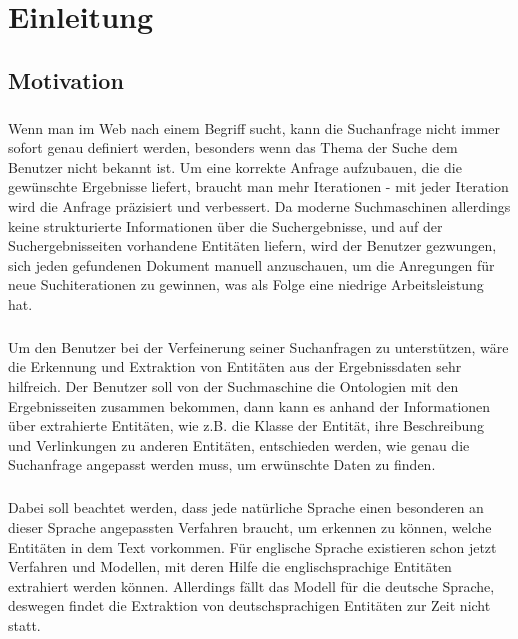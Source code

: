 \chapter{Einleitung}

\section{Motivation}
\label{sec:Motivation}
\paragraph{}
Wenn man im Web nach einem Begriff sucht, kann die Suchanfrage nicht immer sofort genau definiert werden, besonders wenn das Thema der Suche dem Benutzer nicht bekannt ist. Um eine korrekte Anfrage aufzubauen, die die gewünschte Ergebnisse liefert, braucht man mehr Iterationen - mit jeder Iteration wird die Anfrage präzisiert und verbessert. Da moderne Suchmaschinen allerdings keine strukturierte Informationen über die Suchergebnisse, und auf der Suchergebnisseiten vorhandene Entitäten liefern, wird der Benutzer gezwungen, sich jeden gefundenen Dokument manuell anzuschauen, um die Anregungen für neue Suchiterationen zu gewinnen, was als Folge eine niedrige Arbeitsleistung hat.

\paragraph{}
Um den Benutzer bei der Verfeinerung seiner Suchanfragen zu unterstützen, wäre die Erkennung und Extraktion von Entitäten aus der Ergebnissdaten sehr hilfreich. Der Benutzer soll von der Suchmaschine die Ontologien mit den Ergebnisseiten zusammen bekommen, dann kann es anhand der Informationen über extrahierte Entitäten, wie z.B. die Klasse der Entität, ihre Beschreibung und Verlinkungen zu anderen Entitäten, entschieden werden, wie genau die Suchanfrage angepasst werden muss, um erwünschte Daten zu finden.

\paragraph{}
Dabei soll beachtet werden, dass jede natürliche Sprache einen besonderen an dieser Sprache angepassten Verfahren braucht, um erkennen zu können, welche Entitäten in dem Text vorkommen. Für englische Sprache existieren schon jetzt Verfahren und Modellen, mit deren Hilfe die englischsprachige Entitäten extrahiert werden können. Allerdings fällt das Modell für die deutsche Sprache, deswegen findet die Extraktion von deutschsprachigen Entitäten zur Zeit nicht statt.

